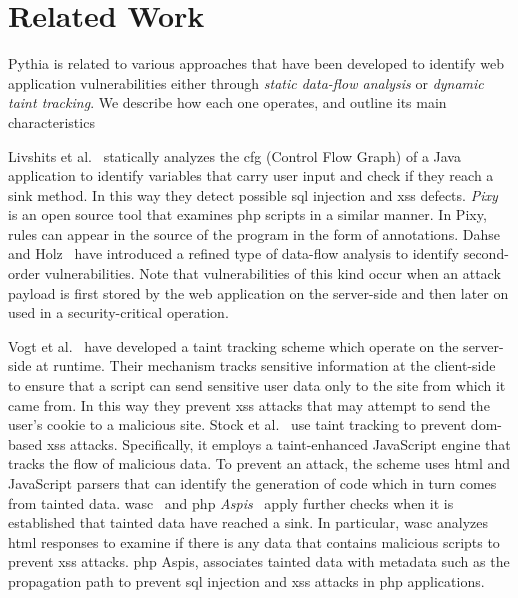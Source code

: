 \section{Related Work}
\label{sec:rel}

Pythia is related to
various approaches that
have been developed to identify web 
application vulnerabilities
either through {\it static data-flow
analysis} or {\it dynamic taint tracking}.
We describe how each one operates,
and outline its main characteristics

Livshits et al.~\cite{LL05}
statically analyzes the {\sc cfg}
(Control Flow Graph) of a Java application
to identify variables
that carry user input and check if
they reach a sink method.
In this way they detect
possible {\sc sql} injection and
{\sc xss} defects.
{\it Pixy}~\cite{JKK06} is an open source tool that examines {\sc php} scripts
in a similar manner.
In Pixy,
rules can appear in the source of the
program in the form of annotations.
Dahse and Holz~\cite{DH14} have introduced a
refined type of data-flow analysis to
identify second-order vulnerabilities.
Note that vulnerabilities of this kind
occur when an attack payload
is first stored by the web application
on the server-side and then later on used
in a security-critical operation.

Vogt et al.~\cite{VFJKKV07} have
developed a taint tracking scheme
which operate on the server-side at runtime.
Their mechanism tracks sensitive
information at the client-side
to ensure that a script can send
sensitive user data only to the
site from which it came from.
In this way they prevent {\sc xss}
attacks that may attempt to send
the user's cookie to a malicious site.
Stock et al.~\cite{SLMS14} use
taint tracking to prevent
{\sc dom}-based {\sc xss} attacks.
Specifically, it employs a taint-enhanced JavaScript engine that
tracks the flow of malicious data.
To prevent an attack,
the scheme uses {\sc html} and JavaScript
parsers that can identify the generation of code which in turn comes from tainted data.
{\sc wasc}~\cite{NLC07} and
{\sc php} {\it Aspis}~\cite{PMP11}
apply further checks when it is
established that tainted data have
reached a sink.
In particular,
{\sc wasc} analyzes {\sc html}
responses to examine
if there is any data that contains malicious
scripts to prevent {\sc xss} attacks.
{\sc php} Aspis,
associates tainted data with metadata
such as the propagation path to
prevent {\sc sql} injection and
{\sc xss} attacks in {\sc php} applications.


